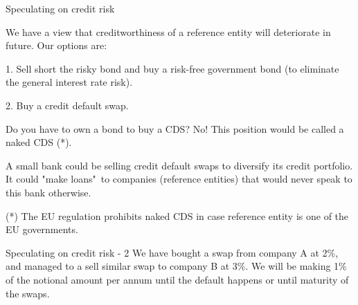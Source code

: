 \documentclass{beamer}
\begin{document}
\begin{frame}{Speculating on credit risk}

\justify
We have a view that creditworthiness of a reference entity will deteriorate in future. Our options are:

1. Sell short the risky bond and buy a risk-free government bond (to eliminate the general interest rate risk).

2. Buy a credit default swap.

\justify
Do you have to own a bond  to buy a CDS? No! This position would be called a naked CDS (*).

\justify
A small bank could be selling credit default swaps to diversify its credit portfolio. It could "make loans"\ to companies (reference entities) that would never speak to this bank otherwise.

\justify
(*) The EU regulation prohibits naked CDS in case reference entity is one of the EU governments.
\end{frame}


\renewcommand{\swapPartyNode}[4]{

	\draw (#1, #2)
		node[
			rectangle,
			draw,
			rounded corners,
			anchor = south,
			minimum height = 0.8cm,
			minimum width = 2.8cm
		]
		(#4)
		{#3};
}

\newcommand{\paymentFlow}[4] {
	\draw [
		->,
		>=triangle 90
	]
	(#1) -- (#2)
	node[
		pos = 0.5,
		anchor = #4
	]
	{#3};
}

\begin{frame}{Speculating on credit risk - 2}
\justify
We have bought a swap from company A at 2\%, and managed to a sell similar swap to company B at 3\%. We will be making 1\% of the notional amount per annum until the default happens or until maturity of the swaps.

\justify
\centering
{}
\end{frame}
\end{document}
